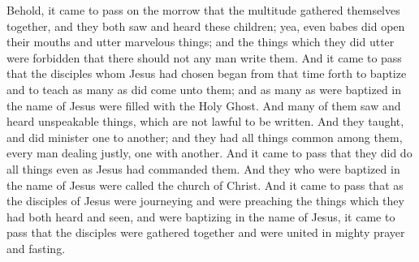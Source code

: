 \bverse \iffalse Behold, it came to pass on the morrow that the multitude gathered themselves together, and they both saw and heard these children; yea, even babes did open their mouths and utter marvelous things; and the things which they did utter were forbidden that there should not any man write them. \fi
Behold, it came to pass on the morrow that the multitude gathered themselves together, and they both saw and heard these children; yea, even babes did open their mouths and utter marvelous things; and the things which they did utter were forbidden that there should not any man write them.
\bverse \iffalse And it came to pass that the disciples whom Jesus had chosen began from that time forth to baptize and to teach as many as did come unto them; and as many as were baptized in the name of Jesus were filled with the Holy Ghost. \fi
And it came to pass that the disciples whom Jesus had chosen began from that time forth to baptize and to teach as many as did come unto them; and as many as were baptized in the name of Jesus were filled with the Holy Ghost.
\bverse \iffalse And many of them saw and heard unspeakable things, which are not lawful to be written. \fi
And many of them saw and heard unspeakable things, which are not lawful to be written.
\bverse \iffalse And they taught, and did minister one to another; and they had all things common among them, every man dealing justly, one with another. \fi
And they taught, and did minister one to another; and they had all things common among them, every man dealing justly, one with another.
\bverse \iffalse And it came to pass that they did do all things even as Jesus had commanded them. \fi
And it came to pass that they did do all things even as Jesus had commanded them.
\bverse \iffalse And they who were baptized in the name of Jesus were called the church of Christ. \fi
And they who were baptized in the name of Jesus were called the church of Christ.
\bchapter
\bverse \iffalse And it came to pass that as the disciples of Jesus were journeying and were preaching the things which they had both heard and seen, and were baptizing in the name of Jesus, it came to pass that the disciples were gathered together and were united in mighty prayer and fasting. \fi
And it came to pass that as the disciples of Jesus were journeying and were preaching the things which they had both heard and seen, and were baptizing in the name of Jesus, it came to pass that the disciples were gathered together and were united in mighty prayer and fasting.
